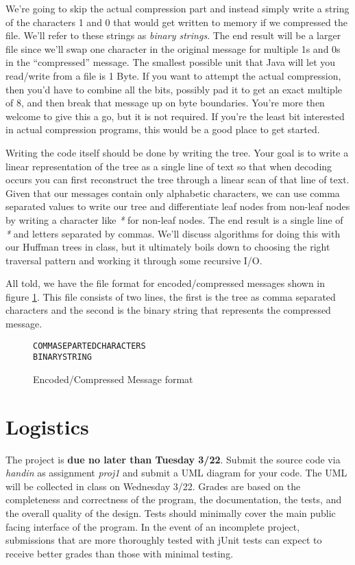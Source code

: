 \documentclass[nobib]{tufte-handout}
\begin{document}
We're going to skip the actual compression part and instead simply write a string of the characters 1 and 0 that would get written to memory if we compressed the file. We'll refer to these strings as \textit{binary strings}. The end result will be a larger file since we'll swap one character in the original message for multiple 1s and 0s in the ``compressed'' message. The smallest possible unit that Java will let you read/write from a file is 1 Byte. If you want to attempt the actual compression, then you'd have to combine all the bits, possibly pad it to get an exact multiple of 8, and then break that message up on byte boundaries. You're more then welcome to give this a go, but it is not required. If you're the least bit interested in actual compression programs, this would be a good place to get started.   

Writing the code itself should be done by writing the tree. Your goal is to write a linear representation of the tree as a single line of text so that when decoding occurs you can first reconstruct the tree through a linear scan of that line of text. Given that our messages contain only alphabetic characters, we can use comma separated values to write our tree and differentiate leaf nodes from non-leaf nodes by writing a character like \textit{*} for non-leaf nodes. The end result is a single line of \textit{*} and letters separated by commas. We'll discuss algorithms for doing this with our Huffman trees in class, but it ultimately boils down to choosing the right traversal pattern and working it through some recursive I/O.  

All told, we have the file format for encoded/compressed messages shown in figure \ref{fig:encodefile}. This file consists of two lines, the first is the tree as comma separated characters and the second is the binary string that represents the compressed message. 

\begin{figure}
\begin{verbatim}
COMMASEPARTEDCHARACTERS
BINARYSTRING
\end{verbatim}
\caption{Encoded/Compressed Message format}
\label{fig:encodefile}
\end{figure}

\section{Logistics}

The project is \textbf{due no later than Tuesday 3/22}. Submit the source code via \textit{handin} as assignment \textit{proj1} and submit a UML diagram for your code. The UML will be collected in class on Wednesday 3/22.   Grades are based on the completeness and correctness of the program, the documentation, the tests, and the overall quality of the design. Tests should minimally cover the main public facing interface of the program. In the event of an incomplete project, submissions that are more thoroughly tested with jUnit tests can expect to receive better grades than those with minimal testing. 
\end{document}
